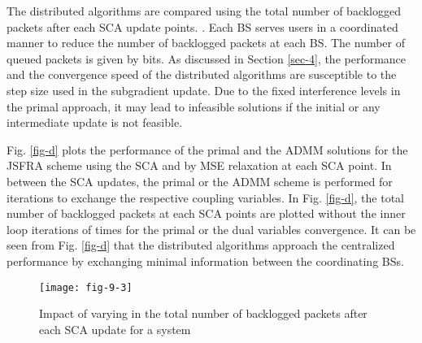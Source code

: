 The distributed algorithms are compared using the total number of backlogged packets after each \ac{SCA} update points. . Each \ac{BS} serves  users in a coordinated manner to reduce the number of backlogged packets at each \ac{BS}. The number of queued packets is given by  bits. As discussed in Section \ref{sec-4}, the performance and the convergence speed of the distributed algorithms are susceptible to the step size used in the subgradient update. Due to the fixed interference levels in the primal approach, it may lead to infeasible solutions if the initial or any intermediate update is not feasible.

Fig. \ref{fig-d} plots the performance of the primal and the \ac{ADMM} solutions for the \ac{JSFRA} scheme using the \ac{SCA} and by \ac{MSE} relaxation at each \ac{SCA} point. In between the \ac{SCA} updates, the primal or the \ac{ADMM} scheme is performed for  iterations to exchange the respective coupling variables. In Fig. \ref{fig-d}, the total number of backlogged packets at each \ac{SCA} points are plotted without the inner loop iterations of  times for the primal or the dual variables convergence. It can be seen from Fig. \ref{fig-d} that the distributed algorithms approach the centralized performance by exchanging minimal information between the coordinating \acp{BS}.
\begin{figure}
	\centering
	\texttt{[image: fig-9-3]}
	\caption{Impact of varying  in the total number of backlogged packets after each \ac{SCA} update for a system }
	\label{fig-d-3.1}
\end{figure}

